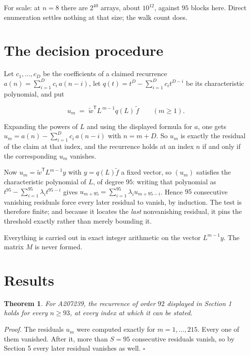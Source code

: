 \documentclass[11pt]{article}
\newtheorem{theorem}{Theorem}
\theoremstyle{definition}
\begin{document}
For scale: at $n = 8$ there are $2^{40}$ arrays, about $10^{12}$, against $95$ blocks here. Direct enumeration settles nothing at that size; the walk count does.

\section{The decision procedure}

Let $c_1,\dots,c_D$ be the coefficients of a claimed recurrence $a(n) = \sum_{i=1}^{D} c_i\,a(n-i)$, let $q(t) = t^{D} - \sum_{i=1}^{D} c_i t^{D-i}$ be its characteristic polynomial, and put

\[u_m \;=\; \tilde w^{\mathsf T} L^{\,m-1} q(L)\,\tilde f \qquad (m \ge 1).\]

Expanding the powers of $L$ and using the displayed formula for $a$, one gets $u_m = a(n) - \sum_{i=1}^{D} c_i\,a(n-i)$ with $n = m + D$. So $u_m$ is exactly the residual of the claim at that index, and the recurrence holds at an index $n$ if and only if the corresponding $u_m$ vanishes.

Now $u_m = \tilde w^{\mathsf T} L^{m-1} y$ with $y = q(L)\tilde f$ a fixed vector, so $(u_m)$ satisfies the characteristic polynomial of $L$, of degree $95$: writing that polynomial as $t^{95} - \sum_{i=1}^{95} \lambda_i t^{95-i}$ gives $u_{m+95} = \sum_{i=1}^{95} \lambda_i u_{m+95-i}$. Hence $95$ consecutive vanishing residuals force every later residual to vanish, by induction. The test is therefore finite; and because it locates the {\itshape last} nonvanishing residual, it pins the threshold exactly rather than merely bounding it.

Everything is carried out in exact integer arithmetic on the vector $L^{m-1}y$. The matrix $M$ is never formed.

\section{Results}

\begin{theorem} For A207239, the recurrence of order $92$ displayed in Section 1 holds for every $n \ge 93$, at every index at which it can be stated.\end{theorem}

{\itshape Proof.} The residuals $u_m$ were computed exactly for $m = 1,\dots,215$. Every one of them vanished. After it, more than $S = 95$ consecutive residuals vanish, so by Section 5 every later residual vanishes as well. $\square$
\end{document}
